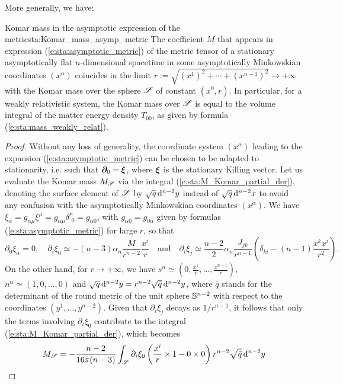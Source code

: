 More generally, we have:

\begin{tprop}{Komar mass in the asymptotic expression of the metric}{sta:Komar_mass_asymp_metric}
The coefficient $M$ that appears in expression (\ref{e:sta:asymptotic_metric})
of the metric tensor of a stationary asymptotically flat $n$-dimensional spacetime
in some asymptotically Minkowskian coordinates $(x^\alpha)$
coincides in the limit $r := \sqrt{(x^1)^2 + \cdots + (x^{n-1})^2} \to +\infty$ with
the Komar mass over the sphere $\mathscr{S}$
of constant $(x^0,r)$.
In particular, for a weakly relativistic system, the Komar mass over $\mathscr{S}$ is equal
to the volume integral of the matter energy density $T_{00}$, as given by formula
(\ref{e:sta:mass_weakly_relat}).
\end{tprop}

\begin{proof}
Without any loss of generality, the coordinate system $(x^\alpha)$ leading
to the expansion (\ref{e:sta:asymptotic_metric}) can be chosen to be adapted
to stationarity, i.e. such that  $\bm{\partial}_0 = \bm{\xi}$, where $\bm{\xi}$ is the
stationary Killing vector.
Let us evaluate the Komar mass $M_{\mathscr{S}}$
via the integral (\ref{e:sta:M_Komar_partial_der}),
denoting the surface element of $\mathscr{S}$ by $\sqrt{q} \, \mathrm{d}^{n-2} y$
instead of $\sqrt{q} \, \mathrm{d}^{n-2} x$  to avoid any
confusion with the asymptotically Minkowskian coordinates $(x^\alpha)$.
We have $\xi_\alpha = g_{\alpha\mu} \xi^\mu = g_{\alpha\mu} \delta^\mu_{\ \, 0} =  g_{\alpha 0}$,
with $g_{\alpha 0} = g_{0\alpha}$ given by formulas (\ref{e:sta:asymptotic_metric}) for large $r$,
so that
\[
    \partial_0 \xi_\alpha = 0, \quad
    \partial_i \xi_0 \simeq - (n-3)\alpha_n\frac{M}{r^{n-2}} \frac{x^i}{r }
    \quad \mbox{and} \quad
    \partial_i \xi_j \simeq \frac{n-2}{2}\alpha_n \frac{J_{jk}}{r^{n-1}}
    \left( \delta_{ki} - (n-1) \frac{x^k x^i}{r^2} \right) .
\]
On the other hand, for $r\to +\infty$, we have
$s^\alpha \simeq \left(0,\frac{x^1}{r}, \ldots,\frac{x^{n-1}}{r} \right)$,
$n^\alpha \simeq (1, 0, \ldots, 0)$ and $\sqrt{q} \, \mathrm{d}^{n-2}y = r^{n-2} \sqrt{\bar{q}} \, \mathrm{d}^{n-2} y$,
where $\bar{q}$ stands for the determinant of the round metric of the unit sphere $\mathbb{S}^{n-2}$ with
respect to the coordinates $(y^1,\ldots,y^{n-2})$. Given that $\partial_i \xi_j$ decays as $1/r^{n-1}$,
it follows that only the terms
involving $\partial_i \xi_0$ contribute to the integral (\ref{e:sta:M_Komar_partial_der}), which becomes
\begin{align}
    M_{\Sp} & = -\frac{n-2}{16\pi(n-3)}
    \int_{\Sp} \partial_i \xi_0 \left( \frac{x^i}{r} \times 1 - 0\times 0 \right) r^{n-2} \sqrt{\bar{q}} \, \D^{n-2} y \nonumber \\

\end{align}
\end{proof}
